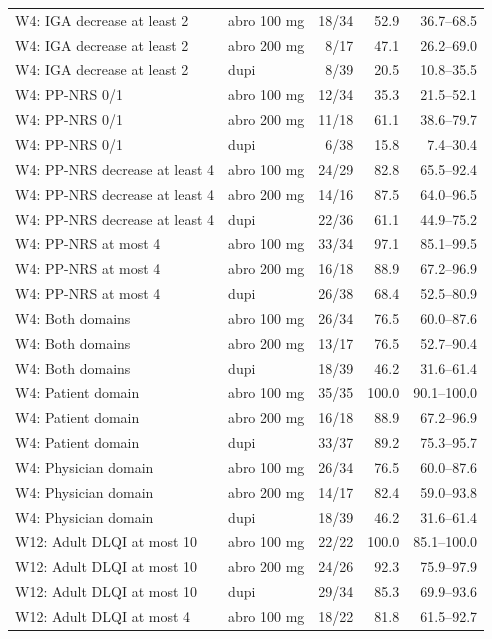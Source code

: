 \begin{longtable}{llrrr}
W4: IGA decrease at least 2 & abro 100 mg & 18/34 & 52.9 & 36.7--68.5 \\
W4: IGA decrease at least 2 & abro 200 mg & 8/17 & 47.1 & 26.2--69.0 \\
W4: IGA decrease at least 2 & dupi & 8/39 & 20.5 & 10.8--35.5 \\
W4: PP-NRS 0/1 & abro 100 mg & 12/34 & 35.3 & 21.5--52.1 \\
W4: PP-NRS 0/1 & abro 200 mg & 11/18 & 61.1 & 38.6--79.7 \\
W4: PP-NRS 0/1 & dupi & 6/38 & 15.8 & 7.4--30.4 \\
W4: PP-NRS decrease at least 4 & abro 100 mg & 24/29 & 82.8 & 65.5--92.4 \\
W4: PP-NRS decrease at least 4 & abro 200 mg & 14/16 & 87.5 & 64.0--96.5 \\
W4: PP-NRS decrease at least 4 & dupi & 22/36 & 61.1 & 44.9--75.2 \\
W4: PP-NRS at most 4 & abro 100 mg & 33/34 & 97.1 & 85.1--99.5 \\
W4: PP-NRS at most 4 & abro 200 mg & 16/18 & 88.9 & 67.2--96.9 \\
W4: PP-NRS at most 4 & dupi & 26/38 & 68.4 & 52.5--80.9 \\
W4: Both domains & abro 100 mg & 26/34 & 76.5 & 60.0--87.6 \\
W4: Both domains & abro 200 mg & 13/17 & 76.5 & 52.7--90.4 \\
W4: Both domains & dupi & 18/39 & 46.2 & 31.6--61.4 \\
W4: Patient domain & abro 100 mg & 35/35 & 100.0 & 90.1--100.0 \\
W4: Patient domain & abro 200 mg & 16/18 & 88.9 & 67.2--96.9 \\
W4: Patient domain & dupi & 33/37 & 89.2 & 75.3--95.7 \\
W4: Physician domain & abro 100 mg & 26/34 & 76.5 & 60.0--87.6 \\
W4: Physician domain & abro 200 mg & 14/17 & 82.4 & 59.0--93.8 \\
W4: Physician domain & dupi & 18/39 & 46.2 & 31.6--61.4 \\
W12: Adult DLQI at most 10 & abro 100 mg & 22/22 & 100.0 & 85.1--100.0 \\
W12: Adult DLQI at most 10 & abro 200 mg & 24/26 & 92.3 & 75.9--97.9 \\
W12: Adult DLQI at most 10 & dupi & 29/34 & 85.3 & 69.9--93.6 \\
W12: Adult DLQI at most 4 & abro 100 mg & 18/22 & 81.8 & 61.5--92.7 \\

\end{longtable}
